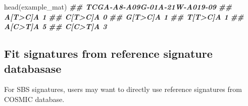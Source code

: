 \documentclass[
  12pt,
  a4paper,
  twoside]{book}
\newenvironment{Shaded}{\begin{snugshade}}{\end{snugshade}}
\newcommand{\DocumentationTok}[1]{\textcolor[rgb]{0.56,0.35,0.01}{\textbf{\textit{#1}}}}
\newcommand{\FunctionTok}[1]{\textcolor[rgb]{0.00,0.00,0.00}{#1}}
\newcommand{\NormalTok}[1]{#1}
\begin{document}
\begin{Shaded}
\begin{Highlighting}[]
\FunctionTok{head}\NormalTok{(example\_mat)}
\DocumentationTok{\#\#         TCGA{-}A8{-}A09G{-}01A{-}21W{-}A019{-}09}
\DocumentationTok{\#\# A[T\textgreater{}C]A                            1}
\DocumentationTok{\#\# C[T\textgreater{}C]A                            0}
\DocumentationTok{\#\# G[T\textgreater{}C]A                            1}
\DocumentationTok{\#\# T[T\textgreater{}C]A                            1}
\DocumentationTok{\#\# A[C\textgreater{}T]A                            5}
\DocumentationTok{\#\# C[C\textgreater{}T]A                            3}
\end{Highlighting}
\end{Shaded}

\hypertarget{fit-signatures-from-reference-signature-databasase}{%
\subsection{Fit signatures from reference signature databasase}\label{fit-signatures-from-reference-signature-databasase}}

For SBS signatures, users may want to directly use reference signatures from COSMIC database.
\end{document}
